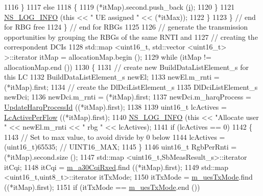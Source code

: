 \begin{DoxyCode}
1116                 \}
1117               \textcolor{keywordflow}{else}
1118                 \{
1119                   (*itMap).second.push\_back (\hyperlink{bernuolliDistribution_8m_a6f6ccfcf58b31cb6412107d9d5281426}{i});
1120                 \}
1121               \hyperlink{group__logging_gafbd73ee2cf9f26b319f49086d8e860fb}{NS\_LOG\_INFO} (\textcolor{keyword}{this} << \textcolor{stringliteral}{" UE assigned "} << (*itMax));
1122             \}
1123         \} \textcolor{comment}{// end for RBG free}
1124     \} \textcolor{comment}{// end for RBGs}
1125 
1126   \textcolor{comment}{// generate the transmission opportunities by grouping the RBGs of the same RNTI and}
1127   \textcolor{comment}{// creating the correspondent DCIs}
1128   std::map <uint16\_t, std::vector <uint16\_t> >::iterator itMap = allocationMap.begin ();
1129   \textcolor{keywordflow}{while} (itMap != allocationMap.end ())
1130     \{
1131       \textcolor{comment}{// create new BuildDataListElement\_s for this LC}
1132       BuildDataListElement\_s newEl;
1133       newEl.m\_rnti = (*itMap).first;
1134       \textcolor{comment}{// create the DlDciListElement\_s}
1135       DlDciListElement\_s newDci;
1136       newDci.m\_rnti = (*itMap).first;
1137       newDci.m\_harqProcess = \hyperlink{classns3_1_1FdMtFfMacScheduler_afd7a229ee6a06798c91a7412d58d06e9}{UpdateHarqProcessId} ((*itMap).first);
1138 
1139       uint16\_t lcActives = \hyperlink{classns3_1_1FdMtFfMacScheduler_a18800c37f8a9e4d30d99552d6d6acd15}{LcActivePerFlow} ((*itMap).first);
1140       \hyperlink{group__logging_gafbd73ee2cf9f26b319f49086d8e860fb}{NS\_LOG\_INFO} (\textcolor{keyword}{this} << \textcolor{stringliteral}{"Allocate user "} << newEl.m\_rnti << \textcolor{stringliteral}{" rbg "} << lcActives);
1141       \textcolor{keywordflow}{if} (lcActives == 0)
1142         \{
1143           \textcolor{comment}{// Set to max value, to avoid divide by 0 below}
1144           lcActives = (uint16\_t)65535; \textcolor{comment}{// UINT16\_MAX;}
1145         \}
1146       uint16\_t RgbPerRnti = (*itMap).second.size ();
1147       std::map <uint16\_t,SbMeasResult\_s>::iterator itCqi;
1148       itCqi = \hyperlink{classns3_1_1FdMtFfMacScheduler_a21ff76bdadf27aac3b87c43f3bc343c8}{m\_a30CqiRxed}.find ((*itMap).first);
1149       std::map <uint16\_t,uint8\_t>::iterator itTxMode;
1150       itTxMode = \hyperlink{classns3_1_1FdMtFfMacScheduler_aabd8cc30ebaf69b99052ddc5c40899e5}{m\_uesTxMode}.find ((*itMap).first);
1151       \textcolor{keywordflow}{if} (itTxMode == \hyperlink{classns3_1_1FdMtFfMacScheduler_aabd8cc30ebaf69b99052ddc5c40899e5}{m\_uesTxMode}.end ())

\end{DoxyCode}
